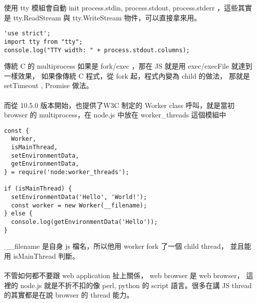   使用 tty 模組會自動 init process.stdin, process.stdout, process.stderr
  ，這些其實是 tty.ReadStream 與 tty.WriteStream 物件，可以直接拿來用。
  \begin{verbatim}
'use strict';
import tty from "tty";
console.log("TTY width: " + process.stdout.columns);
  \end{verbatim}
  傳統 C 的 multiprocess 如果是 fork/exec ，那在 JS 就是用 exec/execFile
  就達到一樣效果， 如果像傳統 C 程式，從 fork 起，程式內變為 child 的做法，
  那就是 setTimeout , Promise 做法。
  \\\\
  而從 10.5.0 版本開始，也提供了W3C 制定的 Worker class 呼叫，就是當初
  browser 的 multiprocess，在 node.js 中放在 worker\_threads 這個模組中
  \begin{verbatim}
const {
  Worker,
  isMainThread,
  setEnvironmentData,
  getEnvironmentData,
} = require('node:worker_threads');

if (isMainThread) {
  setEnvironmentData('Hello', 'World!');
  const worker = new Worker(__filename);
} else {
  console.log(getEnvironmentData('Hello'));
}
  \end{verbatim}
  \_\_filename 是自身 js 檔名，所以他用 worker fork 了一個 child thread，
  並且能用 isMainThread 判斷。
  \\\\
  不管如何都不要跟 web application 扯上關係， web browser 是 web browser，
  這裡的 node.js 就是不折不扣的像 perl, python 的 script 語言。很多在講
  JS thread 的其實都是在說 browser 的 thread 能力。

